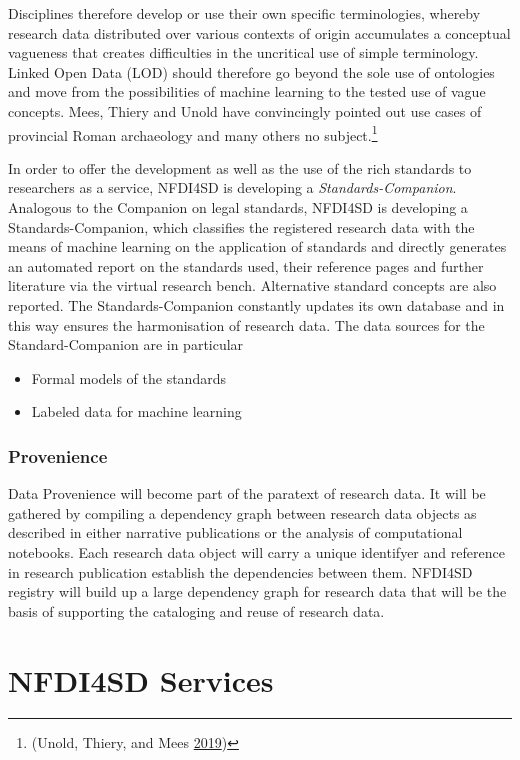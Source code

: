 \documentclass[
  english,
  paper=a4,
  oneside,captions=tableheading
]{scrbook}
\providecommand{\tightlist}{%
  \setlength{\itemsep}{0pt}\setlength{\parskip}{0pt}}
\begin{document}
Disciplines therefore develop or use their own specific terminologies,
whereby research data distributed over various contexts of origin
accumulates a conceptual vagueness that creates difficulties in the
uncritical use of simple terminology. Linked Open Data (LOD) should
therefore go beyond the sole use of ontologies and move from the
possibilities of machine learning to the tested use of vague concepts.
Mees, Thiery and Unold have convincingly pointed out use cases of
provincial Roman archaeology and many others no subject.\footnote{(Unold,
  Thiery, and Mees \protect\hyperlink{ref-unold2019}{2019})}

In order to offer the development as well as the use of the rich
standards to researchers as a service, NFDI4SD is developing a
\emph{Standards-Companion}. Analogous to the Companion on legal
standards, NFDI4SD is developing a Standards-Companion, which classifies
the registered research data with the means of machine learning on the
application of standards and directly generates an automated report on
the standards used, their reference pages and further literature via the
virtual research bench. Alternative standard concepts are also reported.
The Standards-Companion constantly updates its own database and in this
way ensures the harmonisation of research data. The data sources for the
Standard-Companion are in particular

\begin{itemize}
\tightlist
\item
  Formal models of the standards
\item
  Labeled data for machine learning
\end{itemize}

\hypertarget{provenience}{%
\subsection{Provenience}\label{provenience}}

Data Provenience will become part of the paratext of research data. It
will be gathered by compiling a dependency graph between research data
objects as described in either narrative publications or the analysis of
computational notebooks. Each research data object will carry a unique
identifyer and reference in research publication establish the
dependencies between them. NFDI4SD registry will build up a large
dependency graph for research data that will be the basis of supporting
the cataloging and reuse of research data.

\hypertarget{nfdi4sd-services}{%
\chapter{NFDI4SD Services}\label{nfdi4sd-services}}
\end{document}
